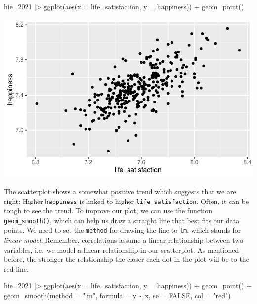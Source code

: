 \documentclass[
  letterpaper,
  DIV=11,
  numbers=noendperiod]{scrreprt}
\newenvironment{Shaded}{\begin{snugshade}}{\end{snugshade}}
\newcommand{\AttributeTok}[1]{\textcolor[rgb]{0.40,0.45,0.13}{#1}}
\newcommand{\ConstantTok}[1]{\textcolor[rgb]{0.56,0.35,0.01}{#1}}
\newcommand{\FunctionTok}[1]{\textcolor[rgb]{0.28,0.35,0.67}{#1}}
\newcommand{\NormalTok}[1]{\textcolor[rgb]{0.00,0.23,0.31}{#1}}
\newcommand{\SpecialCharTok}[1]{\textcolor[rgb]{0.37,0.37,0.37}{#1}}
\newcommand{\StringTok}[1]{\textcolor[rgb]{0.13,0.47,0.30}{#1}}
\begin{document}
\begin{Shaded}
\begin{Highlighting}[]
\NormalTok{hie\_2021 }\SpecialCharTok{|\textgreater{}}
  \FunctionTok{ggplot}\NormalTok{(}\FunctionTok{aes}\NormalTok{(}\AttributeTok{x =}\NormalTok{ life\_satisfaction, }\AttributeTok{y =}\NormalTok{ happiness)) }\SpecialCharTok{+}
  \FunctionTok{geom\_point}\NormalTok{()}
\end{Highlighting}
\end{Shaded}

\includegraphics{10_correlations_files/figure-latex/happiness-vs-life-satisfaction-1.pdf}

The scatterplot shows a somewhat positive trend which suggests that we
are right: Higher \texttt{happiness} is linked to higher
\texttt{life\_satisfaction}. Often, it can be tough to see the trend. To
improve our plot, we can use the function \texttt{geom\_smooth()}, which
can help us draw a straight line that best fits our data points. We need
to set the \texttt{method} for drawing the line to \texttt{lm}, which
stands for \emph{linear model}. Remember, correlations assume a linear
relationship between two variables, i.e.~we model a linear relationship
in our scatterplot. As mentioned before, the stronger the relationship
the closer each dot in the plot will be to the red line.

\begin{Shaded}
\begin{Highlighting}[]
\NormalTok{hie\_2021 }\SpecialCharTok{|\textgreater{}}
  \FunctionTok{ggplot}\NormalTok{(}\FunctionTok{aes}\NormalTok{(}\AttributeTok{x =}\NormalTok{ life\_satisfaction, }\AttributeTok{y =}\NormalTok{ happiness)) }\SpecialCharTok{+}
  \FunctionTok{geom\_point}\NormalTok{() }\SpecialCharTok{+}
  \FunctionTok{geom\_smooth}\NormalTok{(}\AttributeTok{method =} \StringTok{"lm"}\NormalTok{,}
              \AttributeTok{formula =}\NormalTok{ y }\SpecialCharTok{\textasciitilde{}}\NormalTok{ x,}
              \AttributeTok{se =} \ConstantTok{FALSE}\NormalTok{,}
              \AttributeTok{col =} \StringTok{"red"}\NormalTok{)}
\end{Highlighting}
\end{Shaded}
\end{document}
